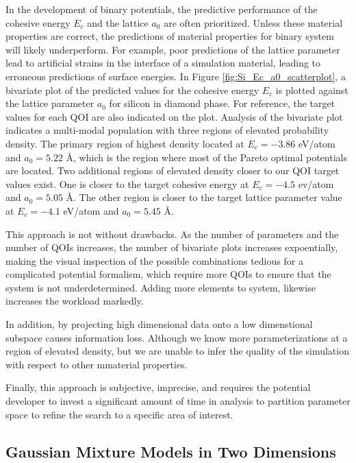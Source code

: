 In the development of binary potentials, the predictive performance of the cohesive energy $E_c$ and the lattice $a_0$ are often prioritized.  Unless these material properties are correct, the predictions of material properties for binary system will likely underperform.  For example, poor predictions of the lattice parameter lead to artificial strains in the interface of a simulation material, leading to erroneous predictions of surface energies.  In Figure \ref{fig:Si_Ec_a0_scatterplot}, a bivariate plot of the predicted values for the cohesive energy $E_c$ is plotted against the lattice parameter $a_0$ for silicon in diamond phase.
For reference, the target values for each QOI are also indicated on the plot.  Analysis of the bivariate plot indicates a multi-modal population with three regions of elevated probability density.
The primary region of highest density located at $E_c=-3.86$ eV/atom and $a_0=5.22$ \AA, which is the region where most of the Pareto optimal potentials are located.  Two additional regions of elevated density closer to our QOI target values exist.  One is closer to the target cohesive energy at $E_c=-4.5$ ev/atom and $a_0=5.05$ \AA.  The other region is closer to the target lattice parameter value at $E_c=-4.1$ eV/atom and $a_0=5.45$ \AA.

This approach is not without drawbacks.  As the number of parameters and the number of QOIs increases, the number of bivariate plots increases expoentially, making the visual inspection of the possible combinations tedious for a complicated potential formalism, which require more QOIs to ensure that the system is not underdetermined.  Adding more elements to system, likewise increases the workload markedly.

In addition, by projecting high dimensional data onto a low dimenstional subspace causes information loss.  Although we know more parameterizations at a region of elevated density, but we are unable to infer the quality of the simulation with respect to other mmaterial properties.

Finally, this approach is subjective, imprecise, and requires the potential developer to invest a significant amount of time in analysis to partition parameter space to refine the search to a specific area of interest.

\subsection{Gaussian Mixture Models in Two Dimensions}

